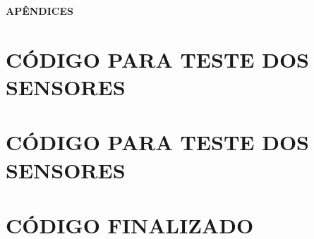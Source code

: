 \pagebreak
\thispagestyle{empty}
\begin{vplace}
\begin{center}
\begin{Huge}
\textbf{
APÊNDICES
}
\end{Huge}
\end{center}
\end{vplace}
\pagebreak

\appendix

\chapter{CÓDIGO PARA TESTE DOS SENSORES}
\label{appendix:A}


\chapter{CÓDIGO PARA TESTE DOS SENSORES}
\label{appendix:B}
 

\chapter{CÓDIGO FINALIZADO}
\label{appendix:C}
 
